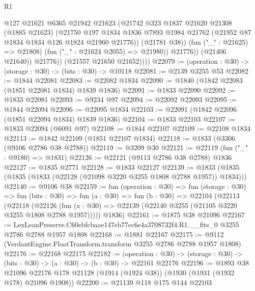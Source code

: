 \begin{lexlean}{R1}
\begin{coremodule}
                      @127
                      @21621
                      @6365
                      @21942
                      @21623
                      (@21742
                        @323
                        @1837
                        @21620
                        @21308
                        (@1885 @21623)
                        (@21750
                          @197
                          @1834
                          @1836
                          @7893
                          @1984
                          @21762
                          (@21952 @87 @1834 @1834 @126 @1824 @21960 @21776))
                        (@21781 @38))
                      (fun ("_" : @21625) => @21808)
                      (fun ("_" : @21624 @2055) => @21980))
                    @21776))
                (@21406 @21640))
              @21776))
          (@21557 @21650 @21652))))
@22079 := (operation : @30) -> (storage : @30) -> (bits : @30) -> @10118
@22081 := @2139 @3255 @53
@22082 := @1844 @22081
@22083 := @22082 @1834
@22090 := @1840 (@1842 @22083 (@1851 @22081 @1834) @1839 @1836)
@22091 := @1833 @22090
@22092 := @1833 @22081
@22093 := @9234 @97
@22094 := @22092 @22093
@22095 := @1844 @22094
@22096 := @22095 @1834
@22103 := @22091 (@1842 @22096 (@1851 @22094 @1834) @1839 @1836)
@22104 := @1833 @22103
@22107 := @1833 @22094 (@6091 @97)
@22108 := @1844 @22107
@22109 := @22108 @1834
@22113 := @1842 @22109 (@1851 @22107 @1834)
@22118 := @1833 (@3306 (@9106 @2786 @38 @2788))
@22119 := @3209 @30
@22121 := @22119 (fun ("_" : @9180) => @1831)
@22126 := @22121 (@9113 @2786 @38 @2788) @1836
@22127 := @1835 @2771
@22128 := @1833 @22127
@22139 := @1833 (@1835 (@1835 (@1833 (@22128 (@21098 @3220 @3255 @1808 @2788 @1957)) @1834)))
@22140 := @9106 @38
@22159 := fun (operation : @30) =>
  fun (storage : @30) =>
  fun (bits : @30) =>
  fun (a : @30) =>
  fun (b : @30) =>
  @22104
    (@22113
      (@22118
        (@22126 (fun (x : @30) => @22139 (@22140 @3255 (@21105 @3220 @3255 @1808 @2788 @1957)))))
      @1836)
@22161 := @1875 @38 @21096
@22167 := LexLeanPreserve.C60ebfcbaae147eb77ec6e4a3708732f4.R1.__fits_0
    @3255
    @2786
    @2788
    @1957
    @1808
@22168 := @1881 @22167
@22175 := @9112 (VerdantEngine.FloatTransform.transform @3255 @2786 @2788 @1957 @1808)
@22176 := @22168 @22175
@22182 := (operation : @30) ->
  (storage : @30) -> (bits : @30) -> (a : @30) -> (b : @30) -> @22161 @22176
@22196 := @1893
    @38
    @21096
    @22176
    @178
    @21128
    (@1914 (@1924 @38))
    (@1930 (@1931 (@1932 @178) @21096 @1908))
@22200 := @21139 @118 @175 @144 @22103

\end{coremodule}
\end{lexlean}
